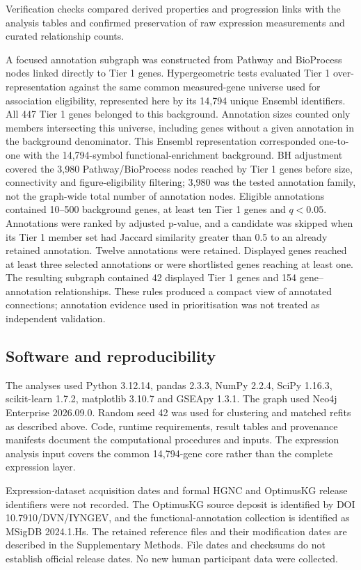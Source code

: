 \documentclass[11pt,a4paper]{article}
\begin{document}
 Verification checks compared derived properties and progression links with the analysis tables and confirmed preservation of raw expression measurements and curated relationship counts.

A focused annotation subgraph was constructed from Pathway and BioProcess nodes linked directly to Tier 1 genes. Hypergeometric tests evaluated Tier 1 over-representation against the same common measured-gene universe used for association eligibility, represented here by its 14,794 unique Ensembl identifiers. All 447 Tier 1 genes belonged to this background. Annotation sizes counted only members intersecting this universe, including genes without a given annotation in the background denominator. This Ensembl representation corresponded one-to-one with the 14,794-symbol functional-enrichment background. BH adjustment covered the 3,980 Pathway/BioProcess nodes reached by Tier 1 genes before size, connectivity and figure-eligibility filtering; 3,980 was the tested annotation family, not the graph-wide total number of annotation nodes. Eligible annotations contained 10--500 background genes, at least ten Tier 1 genes and \(q<0.05\). Annotations were ranked by adjusted p-value, and a candidate was skipped when its Tier 1 member set had Jaccard similarity greater than 0.5 to an already retained annotation. Twelve annotations were retained. Displayed genes reached at least three selected annotations or were shortlisted genes reaching at least one. The resulting subgraph contained 42 displayed Tier 1 genes and 154 gene--annotation relationships. These rules produced a compact view of annotated connections; annotation evidence used in prioritisation was not treated as independent validation.


\subsection*{Software and reproducibility}
The analyses used Python 3.12.14, pandas 2.3.3, NumPy 2.2.4, SciPy 1.16.3, scikit-learn 1.7.2, matplotlib 3.10.7 and GSEApy 1.3.1. The graph used Neo4j Enterprise 2026.09.0. Random seed 42 was used for clustering and matched refits as described above. Code, runtime requirements, result tables and provenance manifests document the computational procedures and inputs. The expression analysis input covers the common 14,794-gene core rather than the complete expression layer.

Expression-dataset acquisition dates and formal HGNC and OptimusKG release identifiers were not recorded. The OptimusKG source deposit is identified by DOI 10.7910/DVN/IYNGEV, and the functional-annotation collection is identified as MSigDB 2024.1.Hs. The retained reference files and their modification dates are described in the Supplementary Methods. File dates and checksums do not establish official release dates. No new human participant data were collected.
\end{document}

